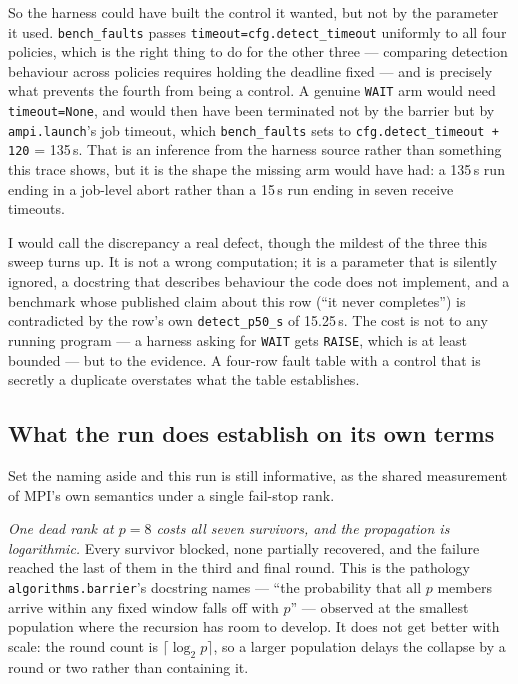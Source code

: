\documentclass[11pt]{article}
\begin{document}
So the harness could have built the control it wanted, but not by the parameter it used.
\texttt{bench\_faults} passes \texttt{timeout=cfg.detect\_timeout} uniformly to all four
policies, which is the right thing to do for the other three --- comparing detection
behaviour across policies requires holding the deadline fixed --- and is precisely what
prevents the fourth from being a control. A genuine \texttt{WAIT} arm would need
\texttt{timeout=None}, and would then have been terminated not by the barrier but by
\texttt{ampi.launch}'s job timeout, which \texttt{bench\_faults} sets to
\texttt{cfg.detect\_timeout + 120} = 135\,s. That is an inference from the harness source
rather than something this trace shows, but it is the shape the missing arm would have
had: a 135\,s run ending in a job-level abort rather than a 15\,s run ending in seven
receive timeouts.

I would call the discrepancy a real defect, though the mildest of the three this sweep
turns up. It is not a wrong computation; it is a parameter that is silently ignored, a
docstring that describes behaviour the code does not implement, and a benchmark whose
published claim about this row (``it never completes'') is contradicted by the row's own
\texttt{detect\_p50\_s} of 15.25\,s. The cost is not to any running program --- a harness
asking for \texttt{WAIT} gets \texttt{RAISE}, which is at least bounded --- but to the
evidence. A four-row fault table with a control that is secretly a duplicate overstates
what the table establishes.

\subsection{What the run does establish on its own terms}

Set the naming aside and this run is still informative, as the shared measurement of MPI's
own semantics under a single fail-stop rank.

\emph{One dead rank at $p=8$ costs all seven survivors, and the propagation is
logarithmic.} Every survivor blocked, none partially recovered, and the failure reached
the last of them in the third and final round. This is the pathology
\texttt{algorithms.barrier}'s docstring names --- ``the probability that all $p$ members
arrive within any fixed window falls off with $p$'' --- observed at the smallest
population where the recursion has room to develop. It does not get better with scale: the
round count is $\lceil \log_2 p \rceil$, so a larger population delays the collapse by a
round or two rather than containing it.
\end{document}
